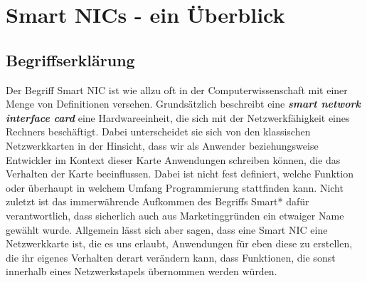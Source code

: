 %
%

\chapter{Smart NICs - ein Überblick}
\label{cha:background}

\section{Begriffserklärung}
Der Begriff Smart NIC ist wie allzu oft in der Computerwissenschaft mit einer Menge von Definitionen versehen. Grundsätzlich beschreibt eine \textbf{\textit{smart network interface card}} eine Hardwareeinheit, die sich mit der Netzwerkfähigkeit eines Rechners beschäftigt. Dabei unterscheidet sie sich von den klassischen Netzwerkkarten in der Hinsicht, dass wir als Anwender beziehungsweise Entwickler im Kontext dieser Karte Anwendungen schreiben können, die das Verhalten der Karte beeinflussen. Dabei ist nicht fest definiert, welche Funktion oder überhaupt in welchem Umfang Programmierung stattfinden kann. Nicht zuletzt ist das immerwährende Aufkommen des Begriffs Smart* dafür verantwortlich, dass sicherlich auch aus Marketinggründen ein etwaiger Name gewählt wurde. Allgemein lässt sich aber sagen, dass eine Smart NIC eine Netzwerkkarte ist, die es uns erlaubt, Anwendungen für eben diese zu erstellen, die ihr eigenes Verhalten derart verändern kann, dass Funktionen, die sonst innerhalb eines Netzwerkstapels übernommen werden würden.

